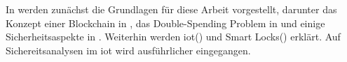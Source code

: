 	\vspace{3em}    
	\noindent In  werden zunächst die Grundlagen für diese Arbeit vorgestellt, darunter das Konzept einer Blockchain in , das Double-Spending Problem in  und einige Sicherheitsaspekte in .
	Weiterhin werden \gls{iot}() und Smart Locks() erklärt.
	Auf Sichereitsanalysen im \gls{iot} wird ausführlicher eingegangen.
